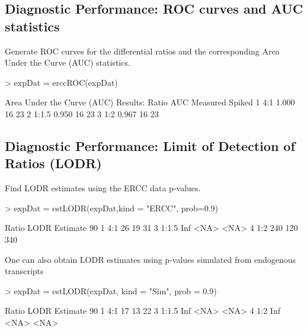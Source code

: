\documentclass{article}
\begin{document}
\subsection{Diagnostic Performance: ROC curves and AUC statistics}
Generate ROC curves for the differential ratios and the corresponding Area Under
the Curve (AUC) statistics.
\begin{center}
\begin{Schunk}
\begin{Sinput}
> expDat = erccROC(expDat)
\end{Sinput}
\begin{Soutput}
Area Under the Curve (AUC) Results:
  Ratio   AUC Measured Spiked
1   4:1 1.000       16     23
2 1:1.5 0.950       16     23
3   1:2 0.967       16     23
\end{Soutput}
\end{Schunk}
\end{center}

\subsection{Diagnostic Performance: Limit of Detection of Ratios (LODR)}
Find LODR estimates using the ERCC data p-values.
\begin{center}
\begin{Schunk}
\begin{Sinput}
> expDat = estLODR(expDat,kind = "ERCC", prob=0.9)
\end{Sinput}
\begin{Soutput}
  Ratio LODR Estimate 90%
1   4:1            26                 19                 31
3 1:1.5           Inf               <NA>               <NA>
4   1:2           240                120                340
\end{Soutput}
\end{Schunk}
\end{center}


One can also obtain LODR estimates using p-values simulated from endogenous transcripts
\begin{center}
\begin{Schunk}
\begin{Sinput}
> expDat = estLODR(expDat, kind = "Sim", prob = 0.9)  
\end{Sinput}
\begin{Soutput}
  Ratio LODR Estimate 90%
1   4:1            17                 13                 22
3 1:1.5           Inf               <NA>               <NA>
4   1:2           Inf               <NA>               <NA>
\end{Soutput}
\end{Schunk}
\end{center}
\end{document}
